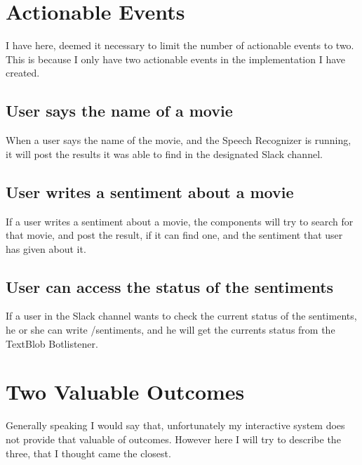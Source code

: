 \documentclass[11pt,fleqn]{book} %
\begin{document}

\chapter{Actionable Events}
I have here, deemed it necessary to limit the number of actionable events to two. This is because I only have two actionable events in the implementation I have created.
\section{User says the name of a movie}
When a user says the name of the movie, and the Speech Recognizer is running, it will post the results it was able to find in the designated Slack channel.

\section{User writes a sentiment about a movie}
If a user writes a sentiment about a movie, the components will try to search for that movie, and post the result, if it can find one, and the sentiment that user has given about it.

\section{User can access the status of the sentiments}
If a user in the Slack channel wants to check the current status of the sentiments, he or she can write /sentiments, and he will get the currents status from the TextBlob Botlistener.




\chapter{Two Valuable Outcomes}
Generally speaking I would say that, unfortunately my interactive system does not provide that valuable of outcomes.
However here I will try to describe the three, that I thought came the closest.
\end{document}
